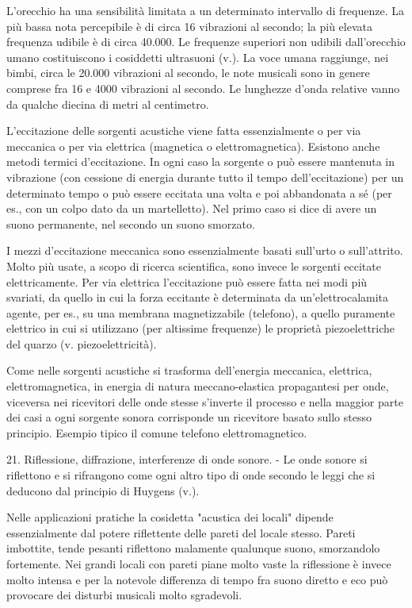 \documentclass[a4paper]{article}
\begin{document}
L'orecchio ha una sensibilità limitata a un determinato intervallo di frequenze. La più bassa nota percepibile è di circa 16 vibrazioni al secondo; la più elevata frequenza udibile è di circa 40.000. Le frequenze superiori non udibili dall'orecchio umano costituiscono i cosiddetti ultrasuoni (v.). La voce umana raggiunge, nei bimbi, circa le 20.000 vibrazioni al secondo, le note musicali sono in genere comprese fra 16 e 4000 vibrazioni al secondo. Le lunghezze d'onda relative vanno da qualche diecina di metri al centimetro.

L'eccitazione delle sorgenti acustiche viene fatta essenzialmente o per via meccanica o per via elettrica (magnetica o elettromagnetica). Esistono anche metodi termici d'eccitazione. In ogni caso la sorgente o può essere mantenuta in vibrazione (con cessione di energia durante tutto il tempo dell'eccitazione) per un determinato tempo o può essere eccitata una volta e poi abbandonata a sé (per es., con un colpo dato da un martelletto). Nel primo caso si dice di avere un suono permanente, nel secondo un suono smorzato.

I mezzi d'eccitazione meccanica sono essenzialmente basati sull'urto o sull'attrito. Molto più usate, a scopo di ricerca scientifica, sono invece le sorgenti eccitate elettricamente. Per via elettrica l'eccitazione può essere fatta nei modi più svariati, da quello in cui la forza eccitante è determinata da un'elettrocalamita agente, per es., su una membrana magnetizzabile (telefono), a quello puramente elettrico in cui si utilizzano (per altissime frequenze) le proprietà piezoelettriche del quarzo (v. piezoelettricità).

Come nelle sorgenti acustiche si trasforma dell'energia meccanica, elettrica, elettromagnetica, in energia di natura meccano-elastica propagantesi per onde, viceversa nei ricevitori delle onde stesse s'inverte il processo e nella maggior parte dei casi a ogni sorgente sonora corrisponde un ricevitore basato sullo stesso principio. Esempio tipico il comune telefono elettromagnetico.

21. Riflessione, diffrazione, interferenze di onde sonore. - Le onde sonore si riflettono e si rifrangono come ogni altro tipo di onde secondo le leggi che si deducono dal principio di Huygens (v.).

Nelle applicazioni pratiche la cosidetta "acustica dei locali" dipende essenzialmente dal potere riflettente delle pareti del locale stesso. Pareti imbottite, tende pesanti riflettono malamente qualunque suono, smorzandolo fortemente. Nei grandi locali con pareti piane molto vaste la riflessione è invece molto intensa e per la notevole differenza di tempo fra suono diretto e eco può provocare dei disturbi musicali molto sgradevoli.
\end{document}
